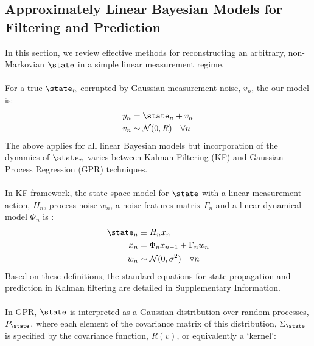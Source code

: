 
\subsection{Approximately Linear Bayesian Models for Filtering and Prediction}  \label{sec:main:part3}
In this section, we review effective methods for reconstructing an arbitrary, non-Markovian $\state$ in a simple linear measurement regime. 
\\
\\
For a true $\state_n$ corrupted by Gaussian measurement noise, $v_n$, the our model is:
\begin{align}
y_n &= \state_n + v_n \\
v_n & \sim \mathcal{N}(0, R) \quad \forall n
\end{align}
The above applies for all linear Bayesian models but incorporation of the dynamics of $\state_n$ varies between Kalman Filtering (KF) and Gaussian Process Regression (GPR) techniques. 
\\
\\
In KF framework, the state space model for $\state$ with a linear measurement action, $H_n$, process noise $w_n$, a noise features matrix $\Gamma_n$ and a linear dynamical model $\Phi_n$  is :
\begin{align}
\state_n & \equiv H_n x_n  \label{eqn:KF:lin_measurement}\\
x_n & = \Phi_n x_{n-1} + \Gamma_n w_n \label{eqn:KF:dynamics} \\
w_n & \sim \mathcal{N}(0, \sigma^2) \quad \forall n
\end{align}
Based on these definitions, the standard equations for state propagation and prediction in Kalman filtering are detailed in Supplementary Information. 
\\
\\
In GPR, $\state$ is interpreted as a Gaussian distribution over random processes, $P_\state$, where each element of the covariance matrix of this distribution, $\Sigma_\state$ is specified by the covariance function, $R(v)$, or equivalently a `kernel':
